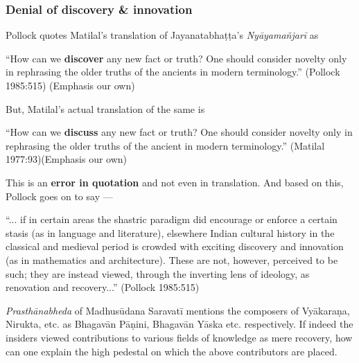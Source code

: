 \subsubsection{Denial of discovery \& innovation}\label{art12-sec3.8.2}

Pollock quotes Matilal's translation of Jayanatabhaṭṭa's {\sl Nyāyamañjarī} as
\begin{myquote}
``How can we {\bf discover} any new fact or truth? One should consider novelty only in rephrasing the older truths of the ancients in modern terminology.'' (Pollock 1985:515) (Emphasis our own)
\end{myquote}

But, Matilal's actual translation of the same is

\newpage

\begin{myquote}
``How can we {\bf discuss} any new fact or truth? One should consider novelty only in rephrasing the older truths of the ancient in modern terminology.'' (Matilal 1977:93)(Emphasis our own)
\end{myquote}

This is an {\bf error in quotation}  and not even in translation. And based on this, Pollock goes on to say ---
\begin{myquote}
``... if in certain areas the shastric paradigm did encourage or enforce a certain stasis (as in language and literature), elsewhere Indian cultural history in the classical and medieval period is crowded with exciting discovery and innovation (as in mathematics and architecture). These are not, however, perceived to be such; they are instead viewed, through the inverting lens of ideology, as renovation and recovery...'' (Pollock 1985:515)
\end{myquote}

{\sl Prasthānabheda} of Madhusūdana Saravatī mentions the composers of Vyākaraṇa, Nirukta, etc. as Bhagavān Pāṇini, Bhagavān Yāska etc. respectively. If indeed the insiders viewed contributions to various ﬁelds of knowledge as mere recovery, how can one explain the high pedestal on which the above contributors are placed. 

